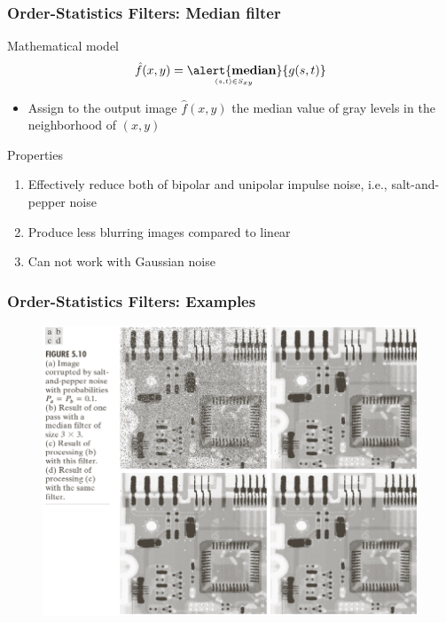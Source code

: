 \documentclass[english,11pt,table,handout]{beamer}
\begin{document}
\frame
{
	\frametitle{Order-Statistics Filters: Median filter}
	
	\begin{block}{Mathematical model}
		\begin{align}
		\nonumber
		\hat{f}(x,y) = \underaccent{(s,t) \in S_{xy}}{\text{\alert{\textbf{median}}}}\{{g(s,t)}\}
		\end{align}
		
		\begin{itemize}
			\item Assign to the output image $\hat{f}(x,y)$ the median value of gray levels in the neighborhood of $(x,y)$
		\end{itemize}
		
	\end{block}
	\begin{alertblock}{Properties}
		\begin{enumerate}
			\item \alert{Effectively} reduce both of bipolar and unipolar impulse noise, i.e., \alert{salt-and-pepper noise}
			\item Produce less blurring images compared to linear 
			\item \alert{Can not} work with Gaussian noise
		\end{enumerate}
	\end{alertblock}
	
}
\frame
{
	\frametitle{Order-Statistics Filters: Examples }
	\begin{figure}[!h]
		\includegraphics[scale=0.7]{median_demo.png}
	\end{figure}
	
}
\end{document}
